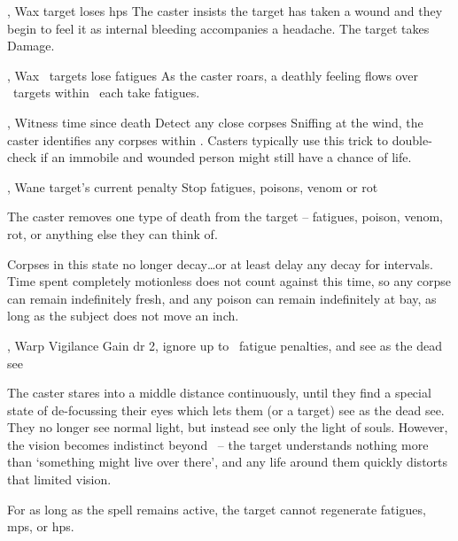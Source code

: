   {\mFate, \mAir}%
  {Wax}%
  {\detailed}%
  {}%
  {target loses  \glspl{hp}}%
  {
    The caster insists the target has taken a wound and they begin to feel it as internal bleeding accompanies a headache.
    The target takes  Damage.
  }

  {\mFate, \mAir}%
  {Wax}%
  {\duplicated}%
  {}%
  {\spellArea\ targets lose  \glspl{fatigue}}%
  {
    As the caster roars, a deathly feeling flows over \spellArea\ targets within \spellRange\ each take  \glspl{fatigue}.
  }

  {\mFate, \mAir}%
  {Witness}%
  {\distant}%
  {time since death}%
  {Detect any close corpses}%
  {
    Sniffing at the wind, the caster identifies any corpses within \spellRange.
    Casters typically use this trick to double-check if an immobile and wounded person might still have a chance of life.
  }

  {\mFate, \mAir}%
  {Wane}%
  {\detailed}%
  {target's current  penalty}%
  {Stop \glspl{fatigue}, poisons, venom or rot}%
  {
    The caster removes one type of death from the target -- \glspl{fatigue}, poison, venom, rot, or anything else they can think of.

    Corpses in this state no longer decay\ldots or at least delay any decay for  \glspl{interval}. 
    Time spent completely motionless does not count against this time, so any corpse can remain indefinitely fresh, and any poison can remain indefinitely at bay, as long as the subject does not move an inch.
  }

  {\mFate, \mAir}%
  {Warp}%
  {\detailed}%
  {Vigilance}%
  {Gain \gls{dr} 2, ignore up to ~\gls{fatigue} penalties, and see as the dead see}%
  {
    The caster stares into a middle distance continuously, until they find a special state of de-focussing their eyes which lets them (or a target) see as the dead see.
    They no longer see normal light, but instead see only the light of souls.
    However, the vision becomes indistinct beyond \spellRange\ -- the target understands nothing more than `something might live over there', and any life around them quickly distorts that limited vision.

    For as long as the spell remains active, the target cannot regenerate \glspl{fatigue}, \glspl{mp}, or \glspl{hp}.
  }


